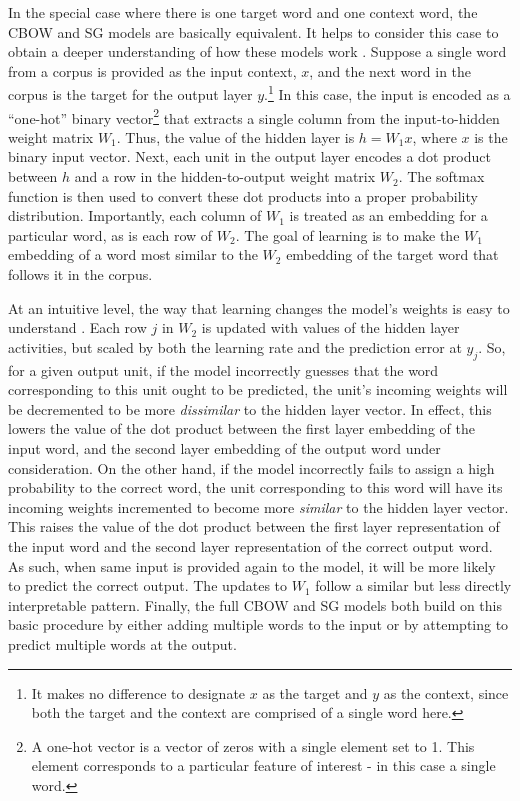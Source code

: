 In the special case where there is one target word and one context word, the CBOW and SG models are basically equivalent. It helps to consider this case to obtain a deeper understanding of how these models work \citep[see][for further details]{Rong:2014}. Suppose a single word from a corpus is provided as the input context, $x$, and the next word in the corpus is the target for the output layer $y$.\footnote{It makes no difference to designate $x$ as the target and $y$ as the context, since both the target and the context are comprised of a single word here.} In this case, the input is encoded as a ``one-hot'' binary vector\footnote{A one-hot vector is a vector of zeros with a single element set to 1. This element corresponds to a particular feature of interest - in this case a single word.} that extracts a single column from the input-to-hidden weight matrix $W_1$. Thus, the value of the hidden layer is $h = W_1 x$, where $x$ is the binary input vector. Next, each unit in the output layer encodes a dot product between $h$ and a row in the hidden-to-output weight matrix $W_2$. The softmax function is then used to convert these dot products into a proper probability distribution. Importantly, each column of $W_1$ is treated as an embedding for a particular word, as is each row of $W_2$. The goal of learning is to make the $W_1$ embedding of a word most similar to the $W_2$ embedding of the target word that follows it in the corpus. 

At an intuitive level, the way that learning changes the model's weights is easy to understand \citep{Rong:2014}. Each row $j$ in $W_2$ is updated with values of the hidden layer activities, but scaled by both the learning rate and the prediction error at $y_j$. So, for a given output unit, if the model incorrectly guesses that the word corresponding to this unit ought to be predicted, the unit's incoming weights will be decremented to be more \textit{dissimilar} to the hidden layer vector. In effect, this lowers the value of the dot product between the first layer embedding of the input word, and the second layer embedding of the output word under consideration. On the other hand, if the model incorrectly fails to assign a high probability to the correct word, the unit corresponding to this word will have its incoming weights incremented to become more \textit{similar} to the hidden layer vector. This raises the value of the dot product between the first layer representation of the input word and the second layer representation of the correct output word. As such, when same input is provided again to the model, it will be more likely to predict the correct output. The updates to $W_1$ follow a similar but less directly interpretable pattern. Finally, the full CBOW and SG models both build on this basic procedure by either adding multiple words to the input or by attempting to predict multiple words at the output. 

